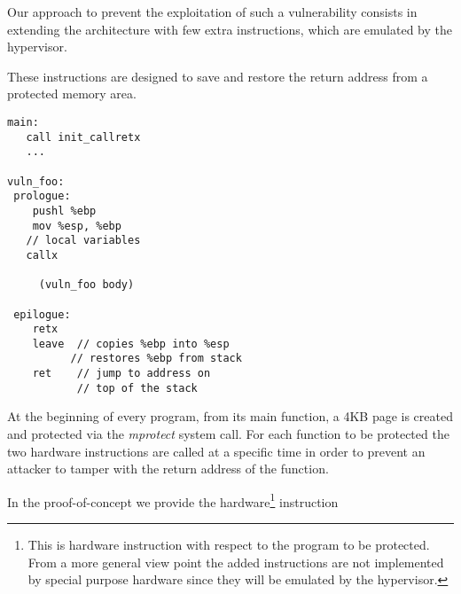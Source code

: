 Our approach to prevent the exploitation of such a vulnerability consists in extending the architecture with few extra instructions, which are emulated by the hypervisor.

These instructions are designed to save and restore the return address from a protected memory area.

\begin{lstlisting}[caption=Instrumented assembly code of vuln\_foo(), label= list:instr]
main:
   call init_callretx 
   ...

vuln_foo:
 prologue:
    pushl %ebp
    mov %esp, %ebp
   // local variables
   callx 

	 (vuln_foo body)

 epilogue:
    retx
    leave  // copies %ebp into %esp
          // restores %ebp from stack
    ret    // jump to address on 
           // top of the stack
\end{lstlisting}  

At the beginning of every program, from its main function, a 4KB page is created and protected via the \emph{mprotect} system call. For each function to be protected the two hardware instructions are called at a specific time in order to prevent an attacker to tamper with the return address of the function.

In the proof-of-concept we provide the hardware\footnote{This is hardware instruction with respect to the program to be protected. From a more general view point the added instructions are not implemented by special purpose hardware since they will be emulated by the hypervisor.} instruction 

